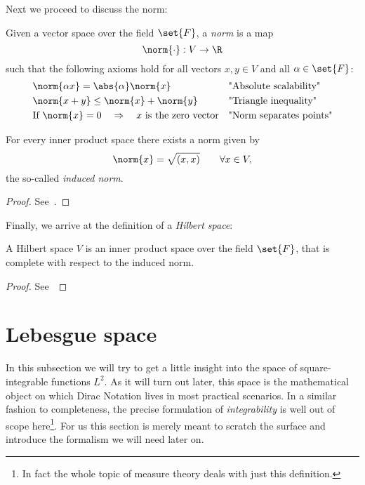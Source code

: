 \noindent
Next we proceed to discuss the norm:
\begin{defn}
	Given a vector space over the field $\set{F}$, a \emph{norm} is a map
	\[ \norm{\cdot} : V \to \R \]
	such that the following axioms hold for all vectors $x,y \in V$ and all $\alpha \in \set{F}$:
	\begin{align} 
		\label{eqn:normScalability}  &\norm{\alpha x} = \abs{\alpha} \norm{x} &&                           \text{"Absolute scalability"} \\
		\label{eqn:normTriaIneq}     &\norm{x + y} \le \norm{x} + \norm{y}    &&                           \text{"Triangle inequality"} \\
		\label{eqn:normPointSep}     &\text{If}~\norm{x} = 0 \quad \Rightarrow \quad \text{$x$ is the zero vector} &&  \text{"Norm separates points"}
	\end{align}
\end{defn}

\begin{prop}
	For every inner product space there exists a norm given by 
	\begin{equation}
		\norm{x} = \sqrt{ (x,x) } \qquad \forall x \in V,
		\label{eqn:normInduced}
	\end{equation}
	the so-called \emph{induced norm}.
	\begin{proof}
		See~\cite{DiracNotation}.
	\end{proof}
\end{prop}

\begin{defn}
\end{defn}

\noindent
Finally, we arrive at the definition of a \emph{Hilbert space}:
\begin{defn}
	A Hilbert space $V$ is an inner product space over the field $\set{F}$, that is complete with respect to the induced norm.
\end{defn}

\begin{prop}
	\begin{proof}
	See~\cite{Adams2003}
	\end{proof}
\end{prop}


\section{Lebesgue space}
In this subsection we will try to get a little insight into the space of square-integrable functions $L^2$.
As it will turn out later, this space is the mathematical object on which Dirac Notation lives in most practical scenarios.
In a similar fashion to completeness, the precise formulation of \emph{integrability} is well out of scope here\footnote{In fact the whole topic of measure theory deals with just this definition.}. 
For us this section is merely meant to scratch the surface and introduce the formalism we will need later on. \\

